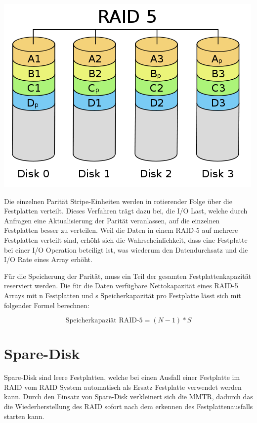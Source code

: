 \begin{center}
\includegraphics[width=\linewidth, keepaspectratio = true]{media/Raid-5.png}
\end{center}

Die einzelnen Parität Stripe-Einheiten werden in rotierender Folge über die Festplatten verteilt. Dieses Verfahren trägt dazu bei, die I/O Last, welche durch Anfragen eine Aktualisierung der Parität veranlassen, auf die einzelnen Festplatten besser zu verteilen. Weil die Daten in einem RAID-5 auf mehrere Festplatten verteilt sind, erhöht sich die Wahrscheinlichkeit, dass eine Festplatte bei einer I/O Operation beteiligt ist, was wiederum den Datendurchsatz und die I/O Rate eines Array erhöht. \cite{Kuratti1995}

Für die Speicherung der Parität, muss ein Teil der gesamten Festplattenkapazität reserviert werden. Die für die Daten verfügbare Nettokapazität eines RAID-5 Arrays mit n Festplatten und s Speicherkapazität pro Festplatte lässt sich mit folgender Formel \cite{Kuratti1995} berechnen:

\begin{equation}
\mbox{Speicherkapaziät RAID-5}=(N-1)*S
\label{eqn:MTBF-RAID-5}
\end{equation}
 
\section{Spare-Disk}
Spare-Disk sind leere Festplatten, welche bei einen Ausfall einer Festplatte im RAID vom RAID System automatisch als Ersatz Festplatte verwendet werden kann. Durch den Einsatz von Spare-Disk verkleinert sich die MMTR, dadurch das die Wiederherstellung des RAID sofort nach dem erkennen des Festplattenausfalls starten kann. 

